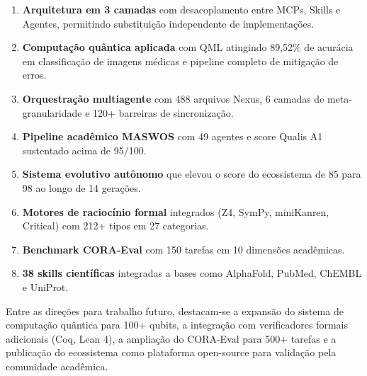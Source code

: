 \documentclass[
  brazil,
  sumario=tradicional,
  10pt
]{abntex2}
\begin{document}
\begin{enumerate}
  \item \textbf{Arquitetura em 3 camadas} com desacoplamento entre
    MCPs, Skills e Agentes, permitindo substituição independente
    de implementações.
  \item \textbf{Computação quântica aplicada} com QML atingindo
    89,52\% de acurácia em classificação de imagens médicas e
    pipeline completo de mitigação de erros.
  \item \textbf{Orquestração multiagente} com 488 arquivos Nexus,
    6 camadas de meta-granularidade e 120+ barreiras de
    sincronização.
  \item \textbf{Pipeline acadêmico MASWOS} com 49 agentes e score
    Qualis A1 sustentado acima de 95/100.
  \item \textbf{Sistema evolutivo autônomo} que elevou o score do
    ecossistema de 85 para 98 ao longo de 14 gerações.
  \item \textbf{Motores de raciocínio formal} integrados (Z4,
    SymPy, miniKanren, Critical) com 212+ tipos em 27 categorias.
  \item \textbf{Benchmark CORA-Eval} com 150 tarefas em 10
    dimensões acadêmicas.
  \item \textbf{38 skills científicas} integradas a bases como
    AlphaFold, PubMed, ChEMBL e UniProt.
\end{enumerate}

Entre as direções para trabalho futuro, destacam-se a expansão do
sistema de computação quântica para 100+ qubits, a integração com
verificadores formais adicionais (Coq, Lean 4), a ampliação do
CORA-Eval para 500+ tarefas e a publicação do ecossistema como
plataforma open-source para validação pela comunidade acadêmica.


\end{document}
